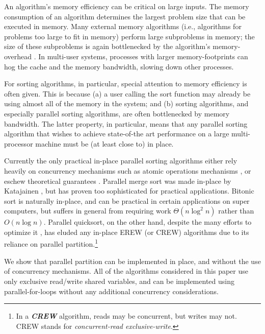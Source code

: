 \documentclass[sigplan, 10pt, nonacm]{acmart}
\newcommand{\defn}[1]{{\textit{\textbf{\boldmath #1}}}}
\renewcommand{\paragraph}[1]{\vspace{0.09in}\noindent{\bf \boldmath #1.}}
\theoremstyle{remark}
\theoremstyle{remark}
\begin{document}
An algorithm's memory efficiency can be critical on large inputs. The
memory consumption of an algorithm determines the largest problem size
that can be executed in memory. Many external memory algorithms (i.e.,
algorithms for problems too large to fit in memory) perform large
subproblems in memory; the size of these subproblems is again
bottlenecked by the algorithm's memory-overhead \cite{Vitter08}. In
multi-user systems, processes with larger memory-footprints can hog
the cache and the memory bandwidth, slowing down other processes.

For sorting algorithms, in particular, special attention to memory
efficiency is often given. This is because (a) a user calling the sort
function may already be using almost all of the memory in the system;
and (b) sorting algorithms, and especially parallel sorting
algorithms, are often bottlenecked by memory bandwidth. The latter
property, in particular, means that any parallel sorting algorithm
that wishes to achieve state-of-the art performance on a large
multi-processor machine must be (at least close to) in place.

Currently the only practical in-place parallel sorting algorithms either rely
heavily on concurrency mechanisms such as atomic operations mechanisms
\cite{HeidelbergerNo90, AxtmannWi17, TsigasZh03}, or eschew
theoretical guarantees \cite{FrancisPa92}. Parallel merge sort
\cite{Hagerup89} was made in-place by Katajainen \cite{Katajainen93},
but has proven too sophisticated for practical applications. Bitonic
sort \cite{BlellochLe98} is naturally in-place, and can be practical
in certain applications on super computers, but suffers in general
from requiring work $\Theta(n \log^2 n)$ rather than $O(n \log
n)$. Parallel quicksort, on the other hand, despite the many efforts
to optimize it \cite{HeidelbergerNo90, AxtmannWi17, TsigasZh03,
  FrancisPa92, Frias08}, has eluded any in-place EREW (or CREW)
algorithms due to its reliance on parallel partition.\footnote{In a
  \defn{CREW} algorithm, reads may be concurrent, but writes may
  not. CREW stands for \emph{concurrent-read exclusive-write}.}

\paragraph{Results}
We show that parallel partition can be implemented in place, and
without the use of concurrency mechanisms. All of the algorithms
considered in this paper use only exclusive read/write shared
variables, and can be implemented using parallel-for-loops without any
additional concurrency considerations. 
\end{document}
